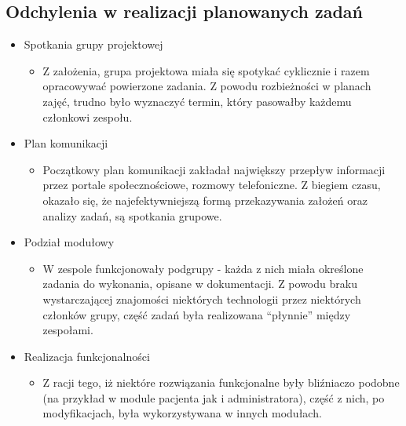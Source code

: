 \subsection{Odchylenia w realizacji planowanych zadań}

\begin{itemize}

	\item Spotkania grupy projektowej
	\begin{itemize}
		\item Z założenia, grupa projektowa miała się spotykać cyklicznie i razem opracowywać powierzone zadania. Z powodu rozbieżności w planach zajęć, trudno było wyznaczyć termin, który pasowałby każdemu członkowi zespołu.
	\end{itemize}
	\item Plan komunikacji
		\begin{itemize}
		\item Początkowy plan komunikacji zakładał największy przepływ informacji przez portale społecznościowe, rozmowy telefoniczne. Z biegiem czasu, okazało się, że najefektywniejszą formą przekazywania założeń oraz analizy zadań, są spotkania grupowe.
	\end{itemize}
	
		\item Podział modułowy
		\begin{itemize}
		\item W zespole funkcjonowały podgrupy - każda z nich miała określone zadania do wykonania, opisane w dokumentacji. Z powodu braku wystarczającej znajomości niektórych technologii przez niektórych członków grupy, część zadań była realizowana “płynnie” między zespołami.
	\end{itemize}
	
		\item Realizacja funkcjonalności
		\begin{itemize}
		\item Z racji tego, iż niektóre rozwiązania funkcjonalne były bliźniaczo podobne (na przykład w module pacjenta jak i administratora), część z nich, po modyfikacjach, była wykorzystywana w innych modułach.
	\end{itemize}
	
\end{itemize}

